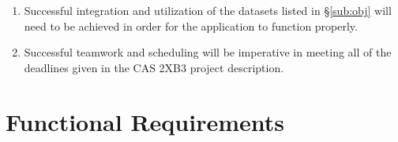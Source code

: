 \documentclass[english]{article}
\begin{document}
\medskip
\begin{enumerate}

\item Successful integration and utilization of the datasets listed in \hyperref[sub:obj]{\S\ref*{sub:obj}} will need to be achieved in order for the application to function properly.
\item Successful teamwork and scheduling will be imperative in meeting all of the deadlines given in the CAS 2XB3 project description.

\end{enumerate}


\section{Functional Requirements}
\label{sec:functional_requirements}
\end{document}
